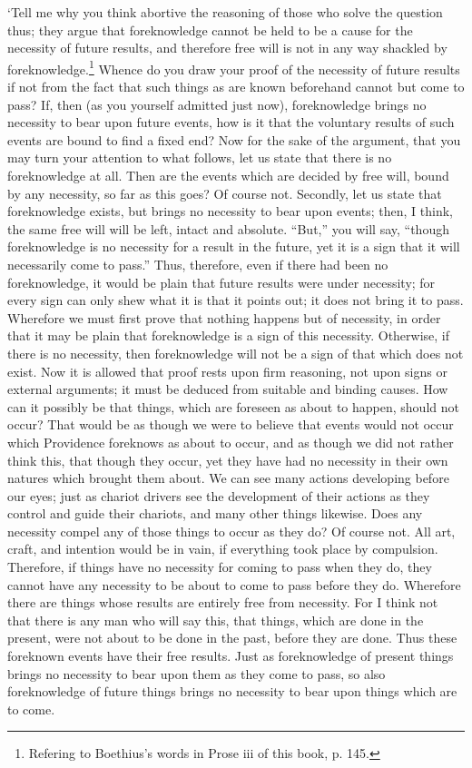 `Tell me why you think abortive the reasoning of those who solve the
question thus; they argue that foreknowledge cannot be held to be a
cause for the necessity of future results, and therefore free will is
not in any way shackled by foreknowledge.\footnote{Refering to
Boethius's words in Prose iii of this book, p. 145.} Whence do you
draw your proof of the necessity of future results if not from the
fact that such things as are known beforehand cannot but come to pass?
If, then (as you yourself admitted just now), foreknowledge brings no
necessity to bear upon future events, how is it that the voluntary
results of such events are bound to find a fixed end? Now for the sake
of the argument, that you may turn your attention to what follows, let
us state that there is no foreknowledge at all. Then are the events
which are decided by free will, bound by any necessity, so far as this
goes?  Of course not. Secondly, let us state that
foreknowledge exists, but brings no necessity to bear upon events;
then, I think, the same free will will be left, intact and absolute.
``But,'' you will say, ``though foreknowledge is no necessity for a
result in the future, yet it is a sign that it will necessarily come
to pass.'' Thus, therefore, even if there had been no foreknowledge,
it would be plain that future results were under necessity; for every
sign can only shew what it is that it points out; it does not bring it
to pass. Wherefore we must first prove that nothing happens but of
necessity, in order that it may be plain that foreknowledge is a sign
of this necessity. Otherwise, if there is no necessity, then
foreknowledge will not be a sign of that which does not exist. Now it
is allowed that proof rests upon firm reasoning, not upon signs or
external arguments; it must be deduced from suitable and binding
causes. How can it possibly be that things, which are foreseen as
about to happen, should not occur? That would be as though we were to
believe that events would not occur which Providence foreknows as
about to occur, and as though we did not rather think this, that
though they occur, yet they have had no necessity in their own natures
which brought them about. We can see many actions developing before
our eyes; just as chariot drivers see the development of their actions
as they control and guide their chariots, and many other things
likewise. Does any necessity compel any of those things  to
occur as they do? Of course not. All art, craft, and intention would
be in vain, if everything took place by compulsion. Therefore, if
things have no necessity for coming to pass when they do, they cannot
have any necessity to be about to come to pass before they do.
Wherefore there are things whose results are entirely free from
necessity. For I think not that there is any man who will say this,
that things, which are done in the present, were not about to be done
in the past, before they are done. Thus these foreknown events have
their free results. Just as foreknowledge of present things brings no
necessity to bear upon them as they come to pass, so also
foreknowledge of future things brings no necessity to bear upon things
which are to come.


